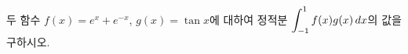 두 함수 $f(x)=e^x+e^{-x}$, $g(x)=\tan x$에 대하여 정적분 $\displaystyle\int_{-1}^{1}f(x)g(x)\mkern3mu dx$의 값을 구하시오.
